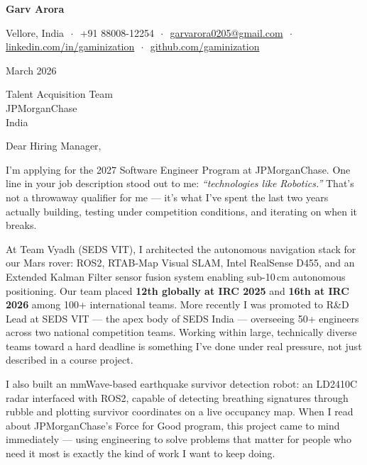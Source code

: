 \documentclass[letterpaper, 11pt]{article}
\begin{document}
{\LARGE \textbf{Garv Arora}}

\vspace{4pt}
{\small Vellore, India $\,\cdot\,$ +91 88008-12254 $\,\cdot\,$ \href{mailto:garvarora0205@gmail.com}{garvarora0205@gmail.com} $\,\cdot\,$ \href{https://linkedin.com/in/gaminization}{linkedin.com/in/gaminization} $\,\cdot\,$ \href{https://github.com/gaminization}{github.com/gaminization}}

\vspace{12pt}
\noindent March 2026

\vspace{4pt}
\noindent Talent Acquisition Team \\
JPMorganChase \\
India

\vspace{12pt}

\noindent Dear Hiring Manager,

\vspace{6pt}


\noindent
I'm applying for the 2027 Software Engineer Program at JPMorganChase.
One line in your job description stood out to me: \textit{``technologies like Robotics.''}
That's not a throwaway qualifier for me --- it's what I've spent the last two years
actually building, testing under competition conditions, and iterating on when it breaks.

\vspace{6pt}
\noindent
At Team Vyadh (SEDS VIT), I architected the autonomous navigation stack for our Mars
rover: ROS2, RTAB-Map Visual SLAM, Intel RealSense D455, and an Extended Kalman Filter
sensor fusion system enabling sub-10\,cm autonomous positioning.
Our team placed \textbf{12th globally at IRC 2025} and \textbf{16th at IRC 2026}
among 100+ international teams.
More recently I was promoted to R\&D Lead at SEDS VIT --- the apex body of SEDS India
--- overseeing 50+ engineers across two national competition teams.
Working within large, technically diverse teams toward a hard deadline is something
I've done under real pressure, not just described in a course project.

\vspace{6pt}
\noindent
I also built an mmWave-based earthquake survivor detection robot: an LD2410C radar
interfaced with ROS2, capable of detecting breathing signatures through rubble and
plotting survivor coordinates on a live occupancy map.
When I read about JPMorganChase's Force for Good program, this project came to mind
immediately --- using engineering to solve problems that matter for people who need it most
is exactly the kind of work I want to keep doing.
\end{document}

